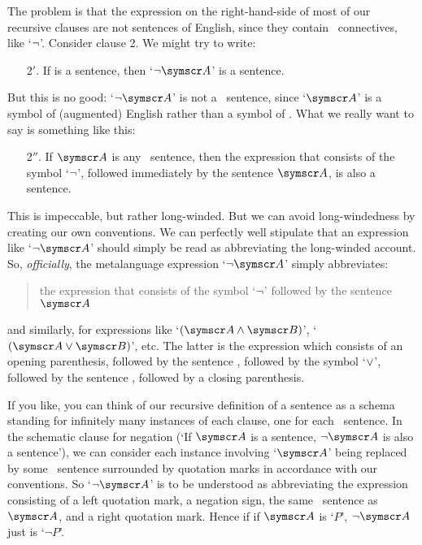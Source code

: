 The problem is that the expression on the right-hand-side of most of our recursive clauses are not sentences of English, since they contain \TFL\ connectives, like `$\neg$'. Consider clause 2. We might try to write:
	\begin{enumerate}
		\item[2$'$.] If  is a sentence, then `$\enot \meta{A}$' is a sentence.
	\end{enumerate}
But this is no good: `$\enot \meta{A}$' is not a \TFL\ sentence, since `$\meta{A}$' is a symbol of (augmented) English rather than a symbol of \TFL. What we really want to say is something like this:
	\begin{enumerate}
		\item[2$''$.] If $\meta{A}$ is any \TFL\ sentence, then the expression that consists of the symbol `$\neg$', followed immediately by the sentence $\meta{A}$, is also a sentence.
	\end{enumerate}
This is impeccable, but rather long-winded. %
But we can avoid long-windedness by creating our own conventions. We can perfectly well stipulate that an expression like `$\enot \meta{A}$' should simply be read as abbreviating the long-winded account. So, \emph{officially}, the metalanguage expression `$\enot \meta{A}$'
simply abbreviates:
\begin{quote}
	the expression that consists of the symbol `$\neg$' followed by the sentence $\meta{A}$
\end{quote}
and similarly, for expressions like `$(\meta{A} \eand \meta{B})$', `$(\meta{A} \eor \meta{B})$', etc. The latter is the expression which consists of an opening parenthesis, followed by the sentence , followed by the symbol `$\vee$', followed by the sentence , followed by a closing parenthesis. 

If you like, you can think of our recursive definition of a sentence as a schema standing for infinitely many instances of each clause, one for each \TFL\ sentence. In the schematic clause for negation (`If $\meta{A}$ is a sentence, $\enot\meta{A}$ is also a sentence'), we can consider each instance involving ‘$\meta{A}$’ being replaced by some \TFL\ sentence surrounded by quotation marks in accordance with our conventions. So ‘$\enot\meta{A}$’ is to be understood as abbreviating the expression consisting of a left quotation mark, a negation sign, the same \TFL\ sentence as $\meta{A}$, and a right quotation mark. Hence if if $\meta{A}$ is `$P$', $\neg\meta{A}$ just is `$\neg P$'.



